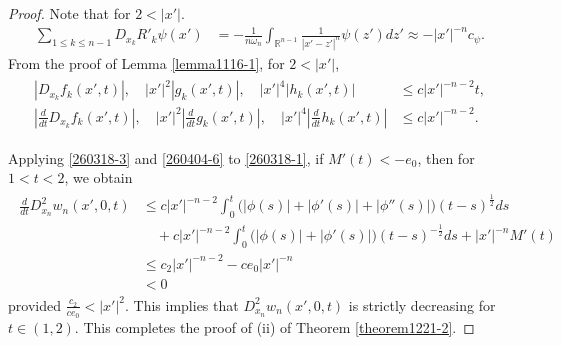 \documentclass[10pt,a4paper]{amsart}
\newcommand{\Rn}{{\mathbb R}^{n-1}}
\newcommand{\om}{{ \omega  }}
\begin{document}
\begin{proof}
 

Note that  for  $  2 < | x'| $.
\begin{align}\label{260318-3}
\sum_{1 \leq k \leq n-1} D_{x_k}   R'_k \psi(x')  & = -    \frac1{n\om_n } \int_{\Rn}  \frac{1} {|x' -z'|^n}   \psi(z')   dz'  \approx - |x'|^{-n} c_\psi.
\end{align}
From the proof of Lemma \ref{lemma1116-1},  for $ 2 < |x'| $,
\begin{align}\label{260404-6}
\begin{split}
|     D_{x_k} f_k ( x', t)|, \quad  |x'|^2|     g_k ( x', t)|, \quad |x'|^4 | h_k (x', t) | & \leq   c |x'|^{-n-2} t,\\
|\frac{d}{d t}  D_{x_k}  f _k ( x', t)|,\quad |x'|^2 |\frac{d}{d t}  g _k ( x', t)|,\quad  |x'|^4 |\frac{d}{d t} h_k ( x', t)|  &  \leq c |x'|^{-n-2}.
\end{split}
\end{align}



 
 

Applying    \eqref{260318-3} and \eqref{260404-6} to  \eqref{260318-1}, if $ M'(t) < -e_0$, then  for $ 1 < t < 2$,  we obtain 
 \begin{align}\label{0915-1-1}
 \begin{split}
  \frac{d}{dt} D^2_{x_n} w_n (x', 0, t) & \leq  c|x'|^{-n-2} \int_0^t \Big( |\phi(s)| + |\phi'(s)|  + |\phi''(s)|   \Big) ( t-s)^{\frac12} ds \\
& \quad +  c|x'|^{-n-2} \int_0^t \Big( |\phi(s)| + |\phi'(s)|     \Big) ( t-s)^{-\frac12} ds+ |x'|^{-n } M'(t)\\
  & \leq   c_2 |x'|^{-n-2}   - c e_0 |x'|^{-n}\\
  & < 0
 \end{split}
 \end{align}
provided $ \frac{c_2}{c e_0}   < |x'|^2 $.
This implies  that $ D^2_{x_n}  w_n (x', 0, t) $ is strictly decreasing for $ t \in (1,2)$. This completes the proof of (ii) of 
Theorem \ref{theorem1221-2}.
\end{proof}
\end{document}

